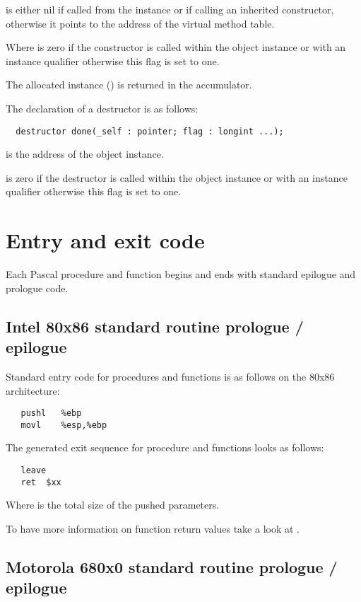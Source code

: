  is either nil if called from the instance
or if calling an inherited constructor, otherwise
it points to the address of the virtual method table.

Where  is zero if the constructor is called
within the object instance or with an instance qualifier
otherwise this flag is set to one. 

The allocated instance () is returned in the accumulator.


The declaration of a destructor is as follows:

\begin{verbatim}
  destructor done(_self : pointer; flag : longint ...);
\end{verbatim}

 is the address of the object instance.

 is zero if the destructor is called
within the object instance or with an instance qualifier
otherwise this flag is set to one.


\section{Entry and exit code}

Each Pascal procedure and function begins and ends with standard
epilogue and prologue code.


\subsection{Intel 80x86 standard routine prologue / epilogue}
Standard entry code for procedures and functions is as follows on the
80x86 architecture:
\begin{verbatim}
   pushl   %ebp
   movl    %esp,%ebp
\end{verbatim}

The generated exit sequence for procedure and functions looks as follows:
\begin{verbatim}
   leave
   ret  $xx
\end{verbatim}

Where  is the total size of the pushed parameters.

To have more information on function return values take a look at
.


\subsection{Motorola 680x0 standard routine prologue / epilogue}

